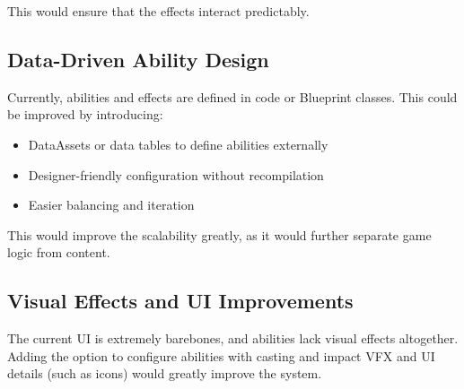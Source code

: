 \documentclass{article}
\begin{document}
This would ensure that the effects interact predictably.

\subsection{Data-Driven Ability Design}

Currently, abilities and effects are defined in code or Blueprint classes. This could be improved by introducing:
\begin{itemize}
    \item DataAssets or data tables to define abilities externally 
    \item Designer-friendly configuration without recompilation 
    \item Easier balancing and iteration 
\end{itemize}

This would improve the scalability greatly, as it would further separate game logic from content.

\subsection{Visual Effects and UI Improvements}

The current UI is extremely barebones, and abilities lack visual effects altogether. Adding the option to configure abilities with casting and impact VFX and UI details (such as icons) would greatly improve the system.
\end{document}
